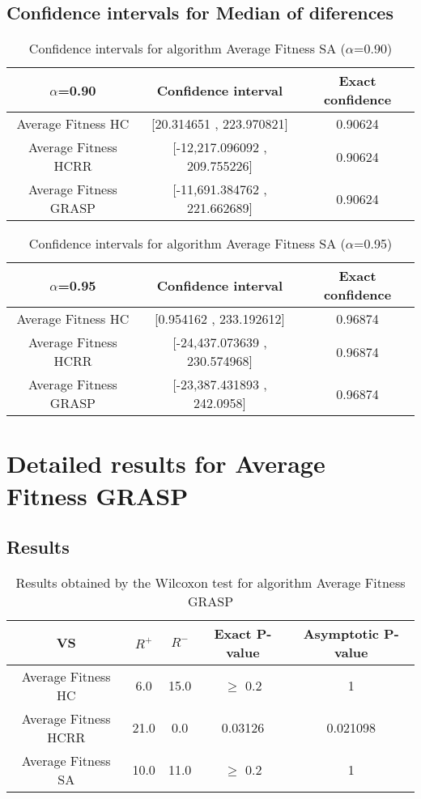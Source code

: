 \documentclass[a4paper,10pt]{article}
\begin{document}
\subsection{Confidence intervals for Median of diferences}

\begin{table}[!htp]
\centering\small
\begin{tabular}{
|c|c|c|}
\hline
 $\alpha$=0.90 & Confidence interval & Exact confidence \\ \hline 
Average Fitness HC     & [20.314651 , 223.970821] & 0.90624\\ \hline 
Average Fitness HCRR    & [-12,217.096092 , 209.755226] & 0.90624\\ \hline 
Average Fitness GRASP & [-11,691.384762 , 221.662689] & 0.90624\\ \hline 

\end{tabular}
\caption{Confidence intervals for algorithm Average Fitness SA   ($\alpha$=0.90)}
\end{table}
\begin{table}[!htp]
\centering\small
\begin{tabular}{
|c|c|c|}
\hline
 $\alpha$=0.95 & Confidence interval & Exact confidence \\ \hline 
Average Fitness HC     & [0.954162 , 233.192612] & 0.96874\\ \hline 
Average Fitness HCRR    & [-24,437.073639 , 230.574968] & 0.96874\\ \hline 
Average Fitness GRASP & [-23,387.431893 , 242.0958] & 0.96874\\ \hline 

\end{tabular}
\caption{Confidence intervals for algorithm Average Fitness SA   ($\alpha$=0.95)}
\end{table}

 \clearpage 


\section{Detailed results for Average Fitness GRASP}


\subsection{Results}

\begin{table}[!htp]
\centering\small
\begin{tabular}{
|c|c|c|c|c|}
\hline
 VS & $R^{+}$ & $R^{-}$ & Exact P-value & Asymptotic P-value \\ \hline 
Average Fitness HC     & 6.0 & 15.0 & $\geq$ 0.2 & 1\\ \hline 
Average Fitness HCRR    & 21.0 & 0.0 & 0.03126 & 0.021098\\ \hline 
Average Fitness SA   & 10.0 & 11.0 & $\geq$ 0.2 & 1\\ \hline 

\end{tabular}
\caption{Results obtained by the Wilcoxon test for algorithm Average Fitness GRASP}
\end{table}
\end{document}
